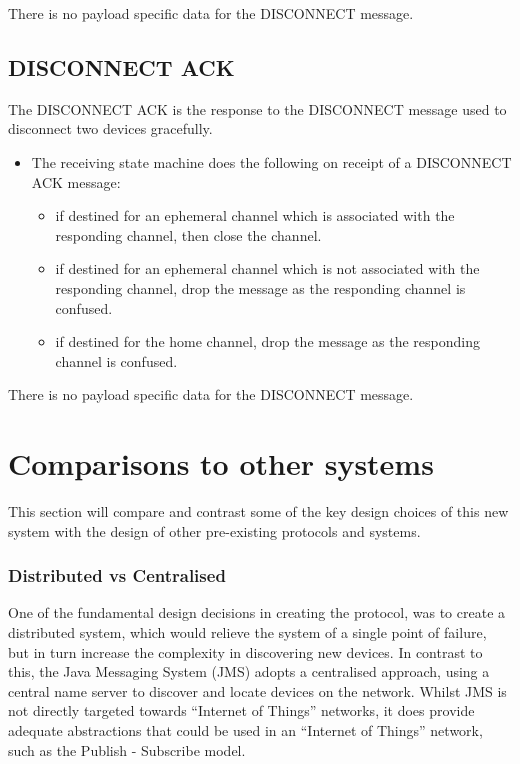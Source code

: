 There is no payload specific data for the DISCONNECT message.

\subsection{DISCONNECT ACK} %
\label{sub:disconnect_ack}
The DISCONNECT ACK is the response to the DISCONNECT message used to disconnect two devices gracefully.
\vspace{-5mm} 
\begin{itemize}
	\item []The receiving state machine does the following on receipt of a DISCONNECT ACK message:
	\begin{itemize}
		\item if destined for an ephemeral channel which is associated with the responding channel, then close the channel.
		\item if destined for an ephemeral channel which is not associated with the responding channel, drop the message as the responding channel is confused. 
		\item if destined for the home channel, drop the message as the responding channel is confused. 
	\end{itemize}
\end{itemize}

There is no payload specific data for the DISCONNECT message.



\section{Comparisons to other systems}
This section will compare and contrast some of the key design choices of this new system with the design of other pre-existing protocols and systems. 

\subsubsection{Distributed vs Centralised} %
\label{ssub:distributed_vs_centralised}
One of the fundamental design decisions in creating the protocol, was to create a distributed system, which would relieve the system of a single point of failure, but in turn increase the complexity in discovering new devices. In contrast to this, the Java Messaging System (JMS) adopts a centralised approach, using a central name server to discover and locate devices on the network. Whilst JMS is not directly targeted towards ``Internet of Things'' networks, it does provide adequate abstractions that could be used in an ``Internet of Things'' network, such as the Publish - Subscribe model.

